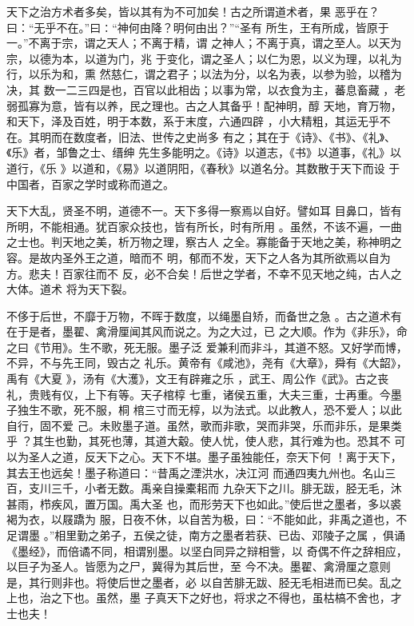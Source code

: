 \documentclass[]{article}
\begin{document}
天下之治方术者多矣，皆以其有为不可加矣！古之所谓道术者，果
恶乎在？曰：``无乎不在。''曰∶``神何由降？明何由出？''``圣有
所生，王有所成，皆原于一。''不离于宗，谓之天人；不离于精，谓
之神人；不离于真，谓之至人。以天为宗，以德为本，以道为门，兆
于变化，谓之圣人；以仁为恩，以义为理，以礼为行，以乐为和，熏
然慈仁，谓之君子；以法为分，以名为表，以参为验，以稽为决，其
数一二三四是也，百官以此相齿；以事为常，以衣食为主，蕃息畜藏
，老弱孤寡为意，皆有以养，民之理也。古之人其备乎！配神明，醇
天地，育万物，和天下，泽及百姓，明于本数，系于末度，六通四辟
，小大精粗，其运无乎不在。其明而在数度者，旧法、世传之史尚多
有之；其在于《诗》、《书》、《礼》、《乐》者，邹鲁之士、缙绅
先生多能明之。《诗》以道志，《书》以道事，《礼》以道行，《乐
》以道和，《易》以道阴阳，《春秋》以道名分。其数散于天下而设
于中国者，百家之学时或称而道之。

天下大乱，贤圣不明，道德不一。天下多得一察焉以自好。譬如耳
目鼻口，皆有所明，不能相通。犹百家众技也，皆有所长，时有所用
。虽然，不该不遍，一曲之士也。判天地之美，析万物之理，察古人
之全。寡能备于天地之美，称神明之容。是故内圣外王之道，暗而不
明，郁而不发，天下之人各为其所欲焉以自为方。悲夫！百家往而不
反，必不合矣！后世之学者，不幸不见天地之纯，古人之大体。道术
将为天下裂。

不侈于后世，不靡于万物，不晖于数度，以绳墨自矫，而备世之急
。古之道术有在于是者，墨翟、禽滑厘闻其风而说之。为之大过，已
之大顺。作为《非乐》，命之曰《节用》。生不歌，死无服。墨子泛
爱兼利而非斗，其道不怒。又好学而博，不异，不与先王同，毁古之
礼乐。黄帝有《咸池》，尧有《大章》，舜有《大韶》，禹有《大夏
》，汤有《大濩》，文王有辟雍之乐
，武王、周公作《武》。古之丧礼，贵贱有仪，上下有等。天子棺椁
七重，诸侯五重，大夫三重，士再重。今墨子独生不歌，死不服，桐
棺三寸而无椁，以为法式。以此教人，恐不爱人；以此自行，固不爱
己。未败墨子道。虽然，歌而非歌，哭而非哭，乐而非乐，是果类乎
？其生也勤，其死也薄，其道大觳。使人忧，使人悲，其行难为也。恐其不
可以为圣人之道，反天下之心。天下不堪。墨子虽独能任，奈天下何
！离于天下，其去王也远矣！墨子称道曰：``昔禹之湮洪水，决江河
而通四夷九州也。名山三百，支川三千，小者无数。禹亲自操橐耜而
九杂天下之川。腓无跋，胫无毛，沐甚雨，栉疾风，置万国。禹大圣
也，而形劳天下也如此。''使后世之墨者，多以裘褐为衣，以屐蹻为
服，日夜不休，以自苦为极，曰：``不能如此，非禹之道也，不足谓墨
。''相里勤之弟子，五侯之徒，南方之墨者若获、已齿、邓陵子之属
，俱诵《墨经》，而倍谲不同，相谓别墨。以坚白同异之辩相訾，以
奇偶不仵之辞相应，以巨子为圣人。皆愿为之尸，冀得为其后世，至
今不决。墨翟、禽滑厘之意则是，其行则非也。将使后世之墨者，必
以自苦腓无跋、胫无毛相进而已矣。乱之上也，治之下也。虽然，墨
子真天下之好也，将求之不得也，虽枯槁不舍也，才士也夫！
\end{document}
